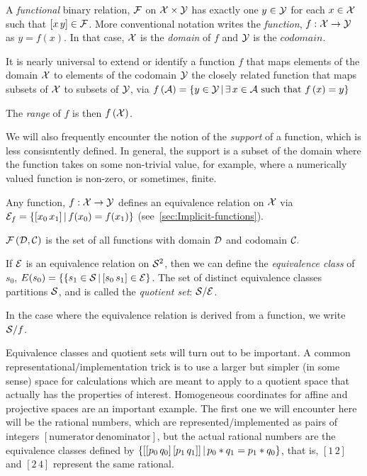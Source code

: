 \label{sec:Functions}

A \textit{functional} binary relation, $\mathcal{F}$ on $\mathcal{X}
\times \mathcal{Y}$ has exactly one $y \in \mathcal{Y}$ for each
$x \in \mathcal{X}$ such that $[x \, y] \in \mathcal{F}$.
More conventional notation writes the \textit{function}, 
$f : \mathcal{X} \rightarrow \mathcal{Y}$ as $y = f(x)$.
In that case, $\mathcal{X}$ is the \textit{domain} of $f$
and $\mathcal{Y}$ is the $codomain$.

It is nearly universal to extend or identify a function $f$ that maps 
elements of the domain $\mathcal{X}$
to elements of 
the codomain $\mathcal{Y}$
the closely related function that maps
subsets of $\mathcal{X}$ to subsets of $\mathcal{Y}$,
via $f\left( \mathcal{A} \right) = 
 \left\{ y \in \mathcal{Y} \, | \, \exists \, x \in \mathcal{A} 
\text{ such that } f\left( x \right) = y \right\} $
 
The \textit{range} of $f$ is then $f\left( \mathcal{X} \right)$.

We will also frequently encounter the notion of the 
\textit{support} of a function, which is less consisntently
defined. In general, the support is a subset of the domain
where the function takes on some non-trivial value, for example,
where a numerically valued function is non-zero, or sometimes,
finite.

Any function, $f : \mathcal{X} \rightarrow \mathcal{Y}$ defines an
equivalence relation on $\mathcal{X}$ via 
$\mathcal{E}_f =  \left\{ [x_0 \, x_1] \, | \, f(x_0) = f(x_1) \right\} $
(see~\ref{sec:Implicit-functions}).

$\mathcal{F}\left( \mathcal{D}, \mathcal{C} \right)$ is the set of all 
functions with domain $\mathcal{D}$ and codomain $\mathcal{C}.$


If $\mathcal{E}$ is an equivalence relation on $\mathcal{S}^2$, then we
can define the \textit{equivalence class} of $s_0$, $E(s_0) = \{
 \left\{ s_1 \in \mathcal{S} \, | \, [s_0 \, s_1] \in \mathcal{E}  \right\} $.
The set of distinct equivalence classes partitions $\mathcal{S}$,
and is called the \textit{quotient set}: $\mathcal{S} / \mathcal{E}$.

In the case where the equivalence relation is derived from a
function, we write $\mathcal{S} / f$.

Equivalence classes and quotient sets will turn out to be
important. A common representational/implementation trick is to
use a larger but simpler (in some sense) space for calculations
which are meant to apply to a quotient space that actually has the
properties of interest. Homogeneous coordinates for affine and
projective spaces  are an important example.
The first one we will encounter here will be the rational numbers,
which are represented/implemented as pairs of integers
$[\text{numerator} \, \text{denominator}]$, but the actual
rational numbers are the equivalence classes defined by 
$ \left\{  [[p_0 \, q_0] \, [p_1 \, q_1]] \, | \, p_0*q_1 = p_1*q_0  \right\} $,
that is, $[1 \, 2]$ and $[2 \, 4]$ represent the same rational.

